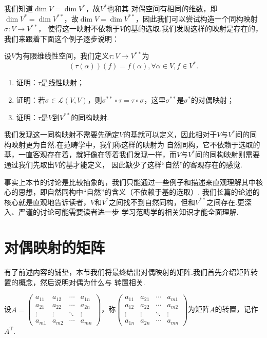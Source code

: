 我们知道$\dim V=\dim V^*$，故$V^*$也和其
对偶空间有相同的维数，即$\dim V^*=\dim V^{**}$，故$\dim V=\dim V^{**}$，因此我们可以尝试构造一个同构映射$\sigma:V\to V^{**}$，
使得这一映射不依赖于$V$的基的选取.我们发现这样的映射是存在的，我们来跟着下面这个例子逐步说明：
\begin{example}
    设$V$为有限维线性空间，我们定义$\tau:V\to V^{**}$为
    \[(\tau(\alpha))(f)=f(\alpha),\forall \alpha\in V, f\in V^*.\]
    \begin{enumerate}[label=(\arabic*)]
        \item 证明：$\tau$是线性映射；
        \item 证明：若$\sigma\in\mathcal{L}(V,V)$，则$\sigma^{**}\circ\tau=\tau\circ\sigma$，这里$\sigma^{**}$是$\sigma^*$的对偶映射；
        \item 证明：$\tau$是$V$到$V^{**}$的同构映射.
    \end{enumerate}
\end{example}
\begin{solution}

\end{solution}

我们发现这一同构映射不需要先确定$V$的基就可以定义，因此相对于$V$与$V^*$间的同构映射更为自然.在范畴学中，我们称这样的映射为
自然同构，它不依赖于选取的基，一直客观存在着，就好像在等着我们发现一样，而$V$与$V^*$间的同构映射则需要通过我们先取出$V$的基才能定义，
因此缺少了这样``自然''的客观存在的感觉.

事实上本节的讨论是比较抽象的，我们只能通过一些例子和描述来直观理解其中核心的思想，即自然同构中``自然''的含义（不依赖于基的选取）.
我们长篇的论述的核心就是直观地告诉读者，$V$和$V^*$之间找不到自然同构，但和$V^{**}$之间存在.更深入、严谨的讨论可能需要读者进一步
学习范畴学的相关知识才能全面理解.

\section{对偶映射的矩阵}
有了前述内容的铺垫，本节我们将最终给出对偶映射的矩阵.我们首先介绍矩阵转置的概念，然后说明对偶为什么与
转置相关.
\begin{definition}
    设$A=\begin{pmatrix}
        a_{11} & a_{12} & \cdots & a_{1n} \\
        a_{21} & a_{22} & \cdots & a_{2n} \\
        \vdots & \vdots & \ddots & \vdots \\
        a_{m1} & a_{m2} & \cdots & a_{mn}
    \end{pmatrix}$，称$\begin{pmatrix}
        a_{11} & a_{21} & \cdots & a_{m1} \\
        a_{12} & a_{22} & \cdots & a_{m2} \\
        \vdots & \vdots & \ddots & \vdots \\
        a_{1n} & a_{2n} & \cdots & a_{mn}
    \end{pmatrix}$为矩阵$A$的转置，记作$A^\mathrm{T}$.
\end{definition}

